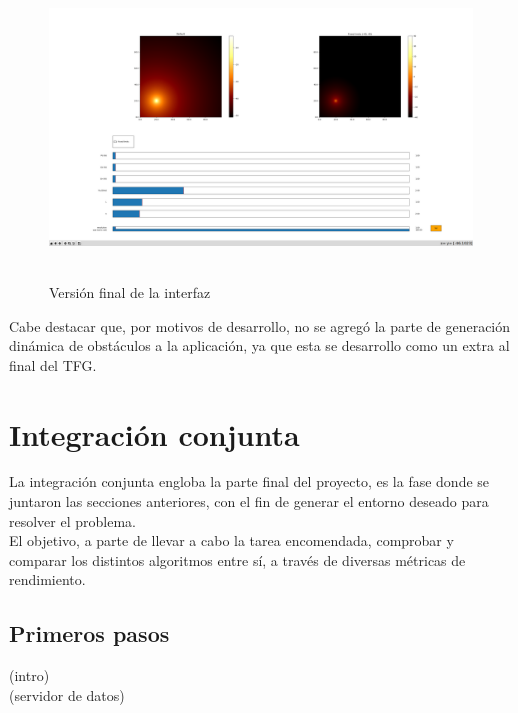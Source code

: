 \begin{figure} [H]
    \begin{center}
    \includegraphics[height=8cm]{imagenes/cap4/7_Friss_endGUI.png}
    \end{center}
	\caption[Versión final de la interfaz]{Versión final de la interfaz}
	\label{fig:friis_end_app}
\end{figure}

Cabe destacar que, por motivos de desarrollo, no se agregó la parte de generación dinámica de obstáculos a la aplicación, ya que esta se desarrollo como un extra al final del \ac{TFG}.\\

\newpage
\section{Integración conjunta}
\label{sec:integration}

La integración conjunta engloba la parte final del proyecto, es la fase donde se juntaron las secciones anteriores, con el fin de generar el entorno deseado para resolver el problema.\\

El objetivo, a parte de llevar a cabo la tarea encomendada, comprobar y comparar los distintos algoritmos entre sí, a través de diversas métricas de rendimiento.\\

\subsection{Primeros pasos}
\label{subsec:primeros_pasos}

(intro)\\

(servidor de datos)\\

